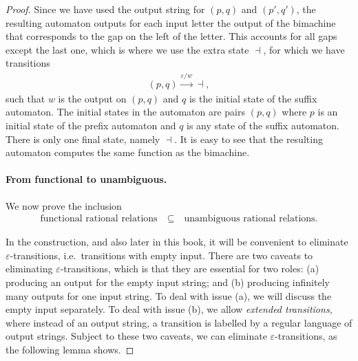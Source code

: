 \begin{proof}
    Since we have used the output string for $(p,q)$ and $(p',q')$, the resulting automaton outputs for each input  letter the output  of the bimachine that corresponds to the gap on the left of the letter. This accounts for all gaps except the last one, which is where we use the extra state $\dashv$, for which we have transitions 
    \begin{align*}
    (p,q) \xrightarrow {\varepsilon/ w} \dashv,
    \end{align*}
    such that $w$ is the output on $(p,q)$ and $q$ is the initial state of the suffix automaton. The initial states in the automaton are pairs $(p,q)$ where $p$ is an initial state of the prefix automaton and $q$ is any state of the suffix automaton. There is only one final state, namely $\dashv$. It is easy to see that the resulting automaton computes the same function as the bimachine.

    \paragraph*{From functional to unambiguous.}
    We now prove the  inclusion
    \begin{align*}
    \text{functional rational relations} \quad \subseteq \quad \text{unambiguous rational relations.}
    \end{align*}
    
            In the construction, and also later in this book,  it will be convenient to eliminate $\varepsilon$-transitions, i.e.~transitions with empty input. There are two caveats to eliminating $\varepsilon$-transitions, which is that they are  essential for two roles: (a) producing an output for the empty input string; and (b) producing infinitely many outputs for one input string.  To deal with issue (a), we will discuss the empty input separately. To deal with issue (b), we allow \emph{extended transitions}, where instead of an output string, a transition is labelled by a regular language of output strings. Subject to these two caveats, we can eliminate $\varepsilon$-transitions, as the following lemma shows.
        

\end{proof}
